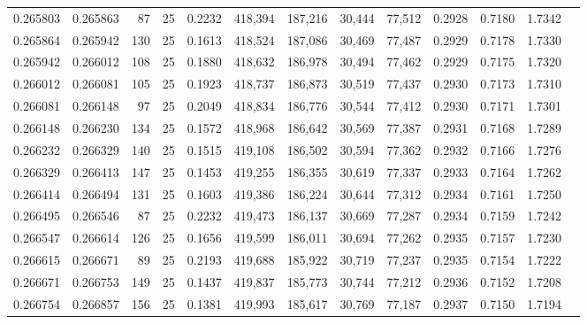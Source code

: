 \begin{tabular}{rrrrrrrrrrrrr}
0.265803 & 0.265863 &    87 &  25 &                                     0.2232 & 418,394 & 187,216 &  30,444 &  77,512 & 0.2928 & 0.7180 & 1.7342 \\
0.265864 & 0.265942 &   130 &  25 &                                     0.1613 & 418,524 & 187,086 &  30,469 &  77,487 & 0.2929 & 0.7178 & 1.7330 \\
0.265942 & 0.266012 &   108 &  25 &                                     0.1880 & 418,632 & 186,978 &  30,494 &  77,462 & 0.2929 & 0.7175 & 1.7320 \\
0.266012 & 0.266081 &   105 &  25 &                                     0.1923 & 418,737 & 186,873 &  30,519 &  77,437 & 0.2930 & 0.7173 & 1.7310 \\
0.266081 & 0.266148 &    97 &  25 &                                     0.2049 & 418,834 & 186,776 &  30,544 &  77,412 & 0.2930 & 0.7171 & 1.7301 \\
0.266148 & 0.266230 &   134 &  25 &                                     0.1572 & 418,968 & 186,642 &  30,569 &  77,387 & 0.2931 & 0.7168 & 1.7289 \\
0.266232 & 0.266329 &   140 &  25 &                                     0.1515 & 419,108 & 186,502 &  30,594 &  77,362 & 0.2932 & 0.7166 & 1.7276 \\
0.266329 & 0.266413 &   147 &  25 &                                     0.1453 & 419,255 & 186,355 &  30,619 &  77,337 & 0.2933 & 0.7164 & 1.7262 \\
0.266414 & 0.266494 &   131 &  25 &                                     0.1603 & 419,386 & 186,224 &  30,644 &  77,312 & 0.2934 & 0.7161 & 1.7250 \\
0.266495 & 0.266546 &    87 &  25 &                                     0.2232 & 419,473 & 186,137 &  30,669 &  77,287 & 0.2934 & 0.7159 & 1.7242 \\
0.266547 & 0.266614 &   126 &  25 &                                     0.1656 & 419,599 & 186,011 &  30,694 &  77,262 & 0.2935 & 0.7157 & 1.7230 \\
0.266615 & 0.266671 &    89 &  25 &                                     0.2193 & 419,688 & 185,922 &  30,719 &  77,237 & 0.2935 & 0.7154 & 1.7222 \\
0.266671 & 0.266753 &   149 &  25 &                                     0.1437 & 419,837 & 185,773 &  30,744 &  77,212 & 0.2936 & 0.7152 & 1.7208 \\
0.266754 & 0.266857 &   156 &  25 &                                     0.1381 & 419,993 & 185,617 &  30,769 &  77,187 & 0.2937 & 0.7150 & 1.7194 \\

\end{tabular}
